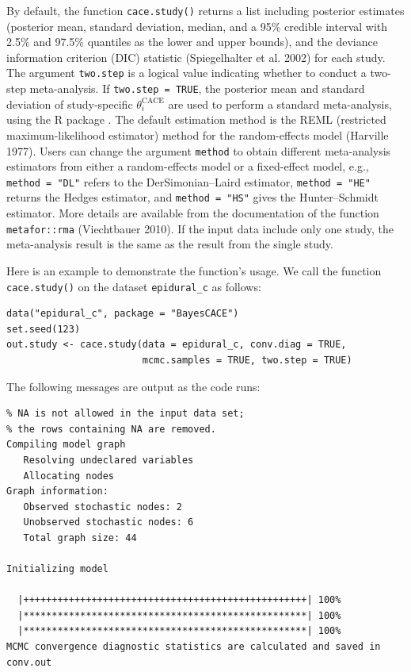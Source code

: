 By default, the function \texttt{cace.study()} returns a list including posterior estimates (posterior mean, standard deviation, median, and a 95\% credible interval with 2.5\% and 97.5\% quantiles as the lower and upper bounds), and the deviance information criterion (DIC) statistic (Spiegelhalter et al. 2002) for each study.
The argument \texttt{two.step} is a logical value indicating whether to conduct a two-step meta-analysis. If \texttt{two.step\ =\ TRUE}, the posterior mean and standard deviation of study-specific \(\theta^\text{CACE}_i\) are used to perform a standard meta-analysis, using the R package . The default estimation method is the REML (restricted maximum-likelihood estimator) method for the random-effects model (Harville 1977). Users can change the argument \texttt{method} to obtain different meta-analysis estimators from either a random-effects model or a fixed-effect model, e.g.,
\texttt{method\ =\ "DL"} refers to the DerSimonian--Laird estimator, \texttt{method\ =\ "HE"} returns the Hedges estimator, and \texttt{method\ =\ "HS"} gives the Hunter--Schmidt estimator. More details are available from the documentation of the function \texttt{metafor::rma} (Viechtbauer 2010). If the input data include only one study, the meta-analysis result is the same as the result from the single study.

Here is an example to demonstrate the function's usage. We call the function \texttt{cace.study()} on the dataset \texttt{epidural\_c} as follows:

\begin{verbatim}
data("epidural_c", package = "BayesCACE")
set.seed(123)
out.study <- cace.study(data = epidural_c, conv.diag = TRUE, 
                        mcmc.samples = TRUE, two.step = TRUE)
\end{verbatim}

The following messages are output as the code runs:

\begin{verbatim}
% NA is not allowed in the input data set;
% the rows containing NA are removed.
Compiling model graph
   Resolving undeclared variables
   Allocating nodes
Graph information:
   Observed stochastic nodes: 2
   Unobserved stochastic nodes: 6
   Total graph size: 44

Initializing model

  |++++++++++++++++++++++++++++++++++++++++++++++++++| 100%
  |**************************************************| 100%
  |**************************************************| 100%
MCMC convergence diagnostic statistics are calculated and saved in conv.out
\end{verbatim}


